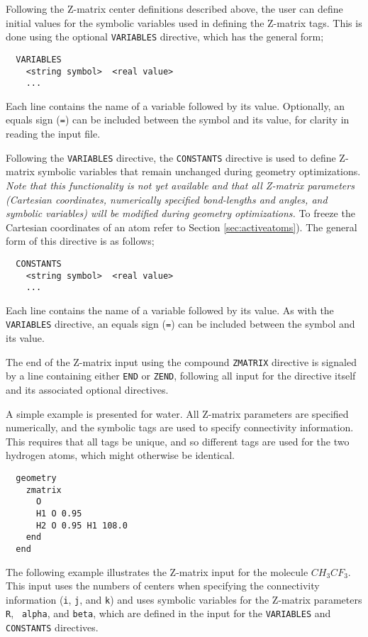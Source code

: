 Following the Z-matrix center definitions described above, the user can
 define initial values for the symbolic variables used in defining the
Z-matrix tags.  This is done using the optional  \verb+VARIABLES+ directive,
which has the general form;

\begin{verbatim}
  VARIABLES
    <string symbol>  <real value>
    ...
\end{verbatim}
Each line contains the name of a variable followed by its value.
Optionally, an equals sign (\verb+=+) can be included between the
symbol and its value, for clarity in reading the input file.

Following the \verb+VARIABLES+ directive, the \verb+CONSTANTS+
directive is used to define Z-matrix symbolic variables that remain
unchanged during geometry optimizations.  {\em Note that this
  functionality is not yet available and that all Z-matrix parameters
  (Cartesian coordinates, numerically specified bond-lengths and
  angles, and symbolic variables) will be modified during geometry
  optimizations.} To freeze the Cartesian coordinates of an atom refer
to Section \ref{sec:activeatoms}).  The general form of this directive
is as follows;
\begin{verbatim}
  CONSTANTS
    <string symbol>  <real value>
    ...
\end{verbatim}
Each line contains the name of a variable followed by its value.  As
with the \verb+VARIABLES+ directive, an equals sign (\verb+=+) can be
included between the symbol and its value.


The end of the Z-matrix input using the compound \verb+ZMATRIX+
directive is signaled by a line containing either \verb+END+ or
\verb+ZEND+, following all input for the directive itself and its
associated optional directives.  

A simple example is presented for water.  All Z-matrix parameters are
specified numerically, and the symbolic tags are used to specify
connectivity information.  This requires that all tags be unique, and
so different tags are used for the two hydrogen atoms, which might 
otherwise be identical.
\begin{verbatim}
  geometry
    zmatrix 
      O
      H1 O 0.95
      H2 O 0.95 H1 108.0
    end
  end
\end{verbatim}

The following example illustrates the Z-matrix input for the molecule
$CH_3CF_3$.  This input uses the numbers of centers when specifying
the connectivity information (\verb+i+, \verb+j+, and \verb+k+) and
uses symbolic variables for the Z-matrix parameters {\tt R}, {\tt
  alpha}, and {\tt beta}, which are defined in the input for the
\verb+VARIABLES+ and
\verb+CONSTANTS+ directives.


